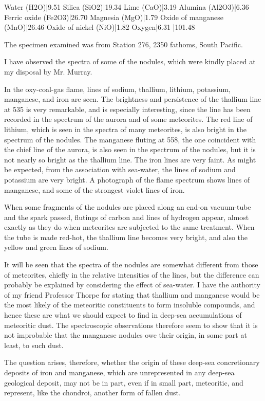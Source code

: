 \documentclass[a4paper, 12pt, oneside, polutonikogreek, english]{article}
\begin{document}
Water (H2O)|9.51 
Silica (SiO2)|19.34 
Lime (CaO)|3.19 
Alumina (Al2O3)|6.36 
Ferric oxide (Fe2O3)|26.70 
Magnesia (MgO)|1.79 
Oxide of manganese (MnO)|26.46 
Oxide of nickel (NiO)|1.82 
Oxygen|6.31 
|101.48 

The specimen examined was from Station 276, 2350 fathoms, South Pacific.

I have observed the spectra of some of the nodules, which were kindly placed at my disposal by Mr. Murray.

In the oxy-coal-gas flame, lines of sodium, thallium, lithium, potassium, manganese, and iron are seen. The brightness and persistence of the thallium line at 535 is very remarkable, and is especially interesting, since the line has been recorded in the spectrum of the aurora and of some meteorites. The red line of lithium, which is seen in the spectra of many meteorites, is also bright in the spectrum of the nodules. The manganese fluting at 558, the one coincident with the chief line of the aurora, is also seen in the spectrum of the nodules, but it is not nearly so bright as the thallium line. The iron lines are very faint. As might be expected, from the association with sea-water, the lines of sodium and potassium are very bright. A photograph of the flame spectrum shows lines of manganese, and some of the strongest violet lines of iron.

When some fragments of the nodules are placed along an end-on vacuum-tube and the spark passed, flutings of carbon and lines of hydrogen appear, almost exactly as they do when meteorites are subjected to the same treatment. When the tube is made red-hot, the thallium line becomes very bright, and also the yellow and green lines of sodium.

It will be seen that the spectra of the nodules are somewhat different from those of meteorites, chiefly in the relative intensities of the lines, but the difference can probably be explained by considering the effect of sea-water. I have the authority of my friend Professor Thorpe for stating that thallium and manganese would be the most likely of the meteoritic constituents to form insoluble compounds, and hence these are what we should expect to find in deep-sea accumulations of meteoritic dust. The spectroscopic observations therefore seem to show that it is not improbable that the manganese nodules owe their origin, in some part at least, to such dust.

The question arises, therefore, whether the origin of these deep-sea concretionary deposits of iron and manganese, which are unrepresented in any deep-sea geological deposit, may not be in part, even if in small part, meteoritic, and represent, like the chondroi, another form of fallen dust.
\end{document}
